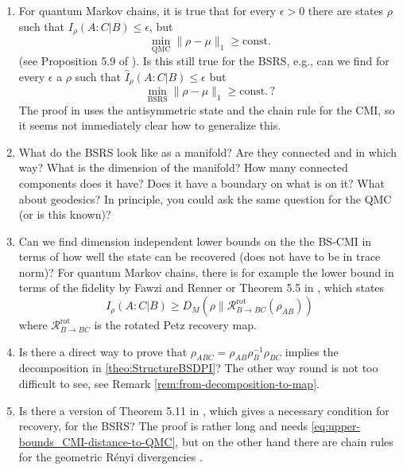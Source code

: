 \documentclass[11pt]{article}
\theoremstyle{newdefinition}
\theoremstyle{newplain}
\theoremstyle{myplain}
\DeclareMathOperator{\1}{\mathds{1}}
\begin{document}
{\begin{enumerate}
    \item For quantum Markov chains, it is true that for every $\epsilon > 0$ there are states $\rho$ such that $I_\rho(A:C|B) \leq \epsilon$, but 
    \begin{equation}
        \min_{\mathrm{QMC}} \|\rho - \mu\|_1 \geq \mathrm{const.}
    \end{equation}
    (see Proposition 5.9 of \cite{sutter2018approximate}). Is this still true for the BSRS, e.g., can we find for every $\epsilon$ a $\rho$ such that $\widehat I_\rho(A:C|B) \leq \epsilon$ but 
       \begin{equation}
        \min_{\mathrm{BSRS}} \|\rho - \mu\|_1 \geq \mathrm{const.} \, ?
    \end{equation}
    The proof in \cite{sutter2018approximate} uses the antisymmetric state and the chain rule for the CMI, so it seems not immediately clear how to generalize this.

    \item What do the BSRS look like as a manifold? Are they connected and in which way? What is the dimension of the manifold? How many connected components does it have? Does it have a boundary on what is on it? What about geodesics? In principle, you could ask the same question for the QMC (or is this known)? 

    \item Can we find dimension independent lower bounds on the the BS-CMI in terms of how well the state can be recovered (does not have to be in trace norm)? For quantum Markov chains, there is for example the lower bound in terms of the fidelity by Fawzi and Renner \cite{Fawzi2015} or Theorem 5.5 in \cite{sutter2018approximate}, which states
    \begin{equation}
        I_\rho(A:C|B) \geq D_M(\rho\| \mathcal R^{\mathrm{rot}}_{B \to BC}(\rho_{AB}))
    \end{equation}
    where $\mathcal{R}^{\mathrm{rot}}_{B \to BC}$ is the rotated Petz recovery map.

    \item Is there a direct way to prove that $\rho_{ABC} = \rho_{AB} \rho_B^{-1} \rho_{BC}$ implies the decomposition in \ref{theo:StructureBSDPI}? The other way round is not too difficult to see, see Remark \ref{rem:from-decomposition-to-map}. 

    \item Is there a version of Theorem 5.11 in \cite{sutter2018approximate}, which gives a necessary condition for recovery, for the BSRS? The proof is rather long and needs \eqref{eq:upper-bounds_CMI-distance-to-QMC}, but on the other hand there are chain rules for the geometric R{\'e}nyi divergencies \cite{berta2022chain}. 


\end{enumerate}}
\end{document}

